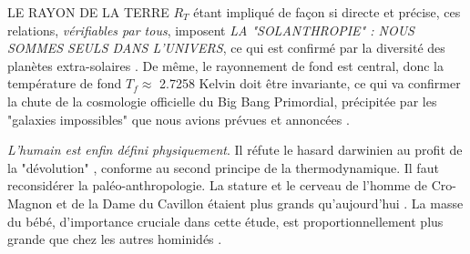 \documentclass[a4paper,12pt]{article}
\begin{document}




LE RAYON DE LA TERRE $R_T$ étant impliqué de façon si directe et précise, ces relations, \textit{vérifiables par tous}, imposent \textit{LA "SOLANTHROPIE" : NOUS SOMMES SEULS DANS L'UNIVERS}, ce qui est confirmé par la diversité des planètes extra-solaires \citep{bibring}. De même, le rayonnement de fond est central, donc la température de fond $T_{f} \approx$ 2.7258 Kelvin doit être invariante, ce qui va confirmer la chute de la cosmologie officielle du Big Bang Primordial, précipitée par les "galaxies impossibles" que nous avions prévues et annoncées \citep{sanchez_2024}.  

\textit{L'humain est enfin défini physiquement}.
Il réfute le hasard darwinien  \cite{tassot} au profit de la "dévolution" \citep{giertych}, conforme au second principe de la thermodynamique. Il faut reconsidérer la paléo-anthropologie.  La stature et le cerveau de l'homme de Cro-Magnon et de la Dame du Cavillon étaient plus grands qu'aujourd'hui \citep{balzeau_ea_2013}. La masse du bébé, d'importance cruciale dans cette étude, est proportionnellement plus grande que chez les autres hominidés \citep{braga}. 




\end{document}
